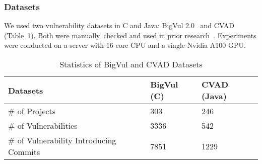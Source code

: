 \subsubsection{\textbf{Datasets}}\label{dataset}

We used two vulnerability datasets in C and Java: BigVul
2.0~\cite{bigvul-msr20} and CVAD~\cite{deepCVA-ase21}
(Table~\ref{dataset:tab}).
Both were manually~checked and used in prior
research~\cite{bigvul-msr20,li2021vulnerability,deepCVA-ase21}. Experiments were
conducted on a server with 16 core CPU and a single Nvidia A100 GPU.




\begin{table}[t]
	\caption{Statistics of BigVul and CVAD Datasets}
        \tabcolsep 2.5pt
        \vspace{-10pt}
	\begin{center}
\small
		\renewcommand{\arraystretch}{1}
		\begin{tabular}{l|p{1.5cm}<{\centering}|p{2cm}<{\centering}}
			
        	Datasets	& BigVul (C) & CVAD (Java)\\\hline
		\# of Projects  & 303 & 246 \\\hline
	    \# of Vulnerabilities & 3336 & 542\\\hline
     	\# of Vulnerability Introducing Commits & 7851 & 1229\\\hline

		\end{tabular}
		\label{dataset:tab}
	\end{center}
\end{table}





